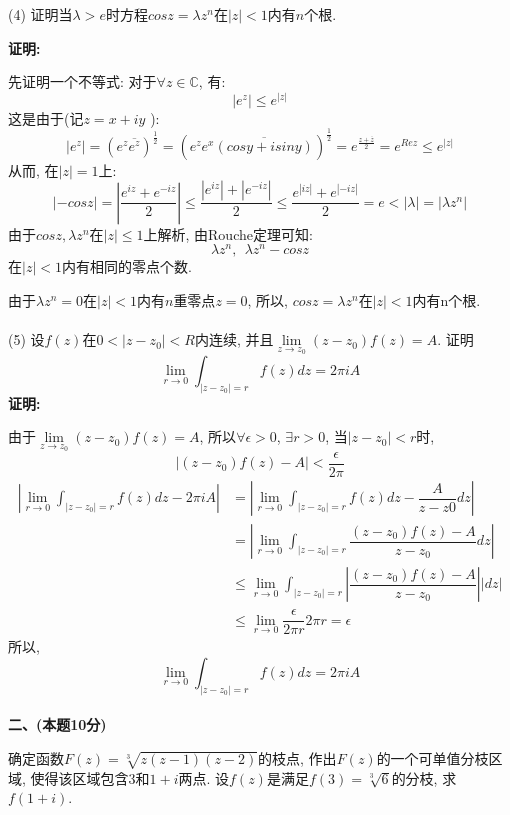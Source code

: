 \documentclass{article}
\begin{document}
(4) 证明当$\lambda>e$时方程$cosz = \lambda z^n$在$|z|<1$内有$n$个根. 

\textbf{证明:} 

先证明一个不等式: 对于$\forall z \in \mathbb{C}$, 有:
$$ |e^z| \leq e^{|z|} $$
这是由于(记$z = x + iy$ ):
$$ \displaystyle{|e^z| = (e^z \overline{e^z})^{\frac{1}{2}} = (e^ze^x\overline{(cosy + isiny)})^{\frac{1}{2}} = e^{\frac{z + \overline{z}}{2}}} = e^{Re z } \leq e^{|z|} $$
从而, 在$|z| = 1$上:
$$ |-cosz| = |\dfrac{e^{iz} + e^{-iz}}{2}| \leq \dfrac{|e^{iz}| + |e^{-iz}|}{2} \leq \dfrac{e^{|iz|} + e^{|-iz|}}{2} = e < |\lambda | = |\lambda z^n| $$
由于$cosz, \lambda z^n$在$ |z| \leq 1$上解析, 由Rouche定理可知:
$$ \lambda z^n , \ \ \lambda z^n - cosz $$
在$|z|< 1$内有相同的零点个数. 

由于$\lambda z^n = 0$在$|z|<1$内有$n$重零点$z=0$, 所以, $cosz = \lambda z^n$在$|z|<1$内有n个根. \\  \\  

(5) 设$f(z)$在$0< |z-z_0| < R$内连续, 并且$\lim\limits_{z \rightarrow z_0} (z-z_0)f(z) = A$. 证明
$$ \lim\limits_{r \rightarrow 0} \int_{|z-z_0|=r} f(z)dz = 2 \pi i A $$
\textbf{证明:} 

由于$\lim\limits_{z \rightarrow z_0} (z-z_0)f(z) = A$, 所以$\forall \epsilon >0$, $\exists r>0$, 当$|z-z_0|<r$时, 
$$ |(z-z_0)f(z) -  A | < \dfrac{\epsilon}{2\pi}  $$
\begin{align*}
\left|\lim\limits_{r \rightarrow 0} \int_{|z-z_0|=r} f(z)dz - 2 \pi i A \right| &=  |\lim\limits_{r \rightarrow 0} \int_{|z-z_0|=r} f(z)dz -  \dfrac{A}{z-z0} dz|\\
             & =  \left|\lim\limits_{r \rightarrow 0}\int_{|z-z_0|=r}  \dfrac{(z-z_0)f(z) - A}{z-z_0}  dz \right|  \\
             & \leq \lim\limits_{r \rightarrow 0} \int_{|z-z_0|=r} \left|\dfrac{(z-z_0)f(z) - A}{z-z_0}\right| \left|dz \right| \\
             & \leq \lim\limits_{r \rightarrow 0} \dfrac{\epsilon}{2\pi r} 2\pi r =  \epsilon
\end{align*}
所以,
$$  \lim\limits_{r \rightarrow 0} \int_{|z-z_0|=r} f(z)dz = 2 \pi i A  $$ \\  

\textbf{二、(本题10分)} 

确定函数$\displaystyle{F(z) =\sqrt[3]{z(z-1)(z-2)}}$的枝点, 作出$F(z)$的一个可单值分枝区域, 使得该区域包含$3$和$1+i$两点. 设$f(z)$是满足$f(3) = \sqrt[3]{6}$的分枝, 求$f(1+i)$. 
\end{document}
